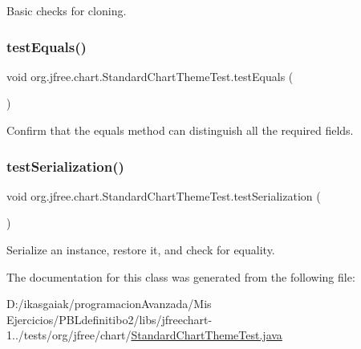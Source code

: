 Basic checks for cloning. \mbox{\label{classorg_1_1jfree_1_1chart_1_1_standard_chart_theme_test_ad431a6f8f8f7981763f77c60e11dbfcb}} 
\subsubsection{\texorpdfstring{test\+Equals()}{testEquals()}}
{\footnotesize\ttfamily void org.\+jfree.\+chart.\+Standard\+Chart\+Theme\+Test.\+test\+Equals (\begin{DoxyParamCaption}{ }\end{DoxyParamCaption})}

Confirm that the equals method can distinguish all the required fields. \mbox{\label{classorg_1_1jfree_1_1chart_1_1_standard_chart_theme_test_a3d1834e40109e5b4dadf2221121c9e69}} 
\subsubsection{\texorpdfstring{test\+Serialization()}{testSerialization()}}
{\footnotesize\ttfamily void org.\+jfree.\+chart.\+Standard\+Chart\+Theme\+Test.\+test\+Serialization (\begin{DoxyParamCaption}{ }\end{DoxyParamCaption})}

Serialize an instance, restore it, and check for equality. 

The documentation for this class was generated from the following file\+:\begin{DoxyCompactItemize}
\item 
D\+:/ikasgaiak/programacion\+Avanzada/\+Mis Ejercicios/\+P\+B\+Ldefinitibo2/libs/jfreechart-\/1../tests/org/jfree/chart/\mbox{\hyperlink{_standard_chart_theme_test_8java}{Standard\+Chart\+Theme\+Test.\+java}}\end{DoxyCompactItemize}
